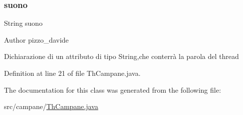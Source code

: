 \subsubsection{\texorpdfstring{suono}{suono}}
{\footnotesize\ttfamily String suono\hspace{0.3cm}{\ttfamily [private]}}

\begin{DoxyAuthor}{Author}
pizzo\+\_\+davide
\end{DoxyAuthor}
Dichiarazione di un attributo di tipo String,che conterrà la parola del thread 

Definition at line 21 of file Th\+Campane.\+java.



The documentation for this class was generated from the following file\+:\begin{DoxyCompactItemize}
\item 
src/campane/\hyperlink{_th_campane_8java}{Th\+Campane.\+java}\end{DoxyCompactItemize}
